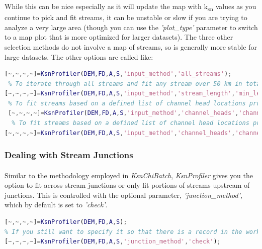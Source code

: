 \noindent
 While this can be nice especially as it will update the map with k\textsubscript{sn} values as you continue to pick and fit streams, it can be unstable or slow if you are trying to analyze a very large area (though you can use the \textit{'plot\_type'} parameter to switch to a map plot that is more optimized for larger datasets). The three other selection methods do not involve a map of streams, so is generally more stable for large datasets. The other options are called like:
 
 \begin{lstlisting}[language=Matlab]
 % To iterate through all streams in the provided STREAMobj:
[~,~,~,~]=KsnProfiler(DEM,FD,A,S,'input_method','all_streams');
 % To iterate through all streams and fit any stream over 50 km in total length:
[~,~,~,~]=KsnProfiler(DEM,FD,A,S,'input_method','stream_length','min_length_to_extract',50000);
 % To fit streams based on a defined list of channel head locations provided as an array of channel head locations (chl in the example below):
 [~,~,~,~]=KsnProfiler(DEM,FD,A,S,'input_method','channel_heads','channel_head_list',chl);
  % To fit streams based on a defined list of channel head locations provided as an array of channel head locations from a point shapefile of channel heads:
[~,~,~,~]=KsnProfiler(DEM,FD,A,S,'input_method','channel_heads','channel_head_list','channel_heads.shp');
 \end{lstlisting}
 
\subsubsection{Dealing with Stream Junctions}
\paragraph{}Similar to the methodology employed in \textit{KsnChiBatch}, \textit{KsnProfiler} gives you the option to fit across stream junctions or only fit portions of streams upstream of junctions. This is controlled with the optional parameter, \textit{'junction\_method'}, which by default is set to \textit{'check'}. 

 \begin{lstlisting}[language=Matlab]
% To run KsnProfiler in default mode where fits do not occur across stream junctions, no argument is required for 'junction_method':
[~,~,~,~]=KsnProfiler(DEM,FD,A,S);
% If you still want to specify it so that there is a record in the workspace:
[~,~,~,~]=KsnProfiler(DEM,FD,A,S,'junction_method','check');
\end{lstlisting}


